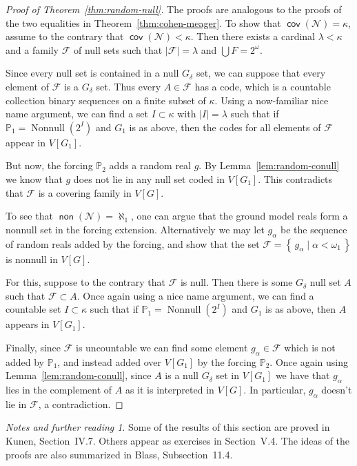 \documentclass[11pt,oneside]{amsbook}
\newcommand{\set}[1]{\left\{\,#1\,\right\}}
\newcommand{\PP}{\mathbb P}
\newcommand{\Null}{\mathcal N}
\DeclareMathOperator{\non}{\mathsf{non}}
\DeclareMathOperator{\cov}{\mathsf{cov}}
\DeclareMathOperator{\Nonnull}{Nonnull}
\theoremstyle{definition}
\theoremstyle{plain}
\theoremstyle{definition}
\theoremstyle{remark}
\newtheorem*{notes}{Notes and further reading}
\numberwithin{equation}{section}
\numberwithin{figure}{section}
\begin{document}
\begin{proof}[Proof of Theorem~\ref{thm:random-null}]
  The proofs are analogous to the proofs of the two equalities in Theorem~\ref{thm:cohen-meager}. To show that $\cov(\Null)=\kappa$, assume to the contrary that $\cov(\Null)<\kappa$. Then there exists a cardinal $\lambda<\kappa$ and a family $\mathcal F$ of null sets such that $|\mathcal F|=\lambda$ and $\bigcup F=2^\omega$.

  Since every null set is contained in a null $G_\delta$ set, we can suppose that every element of $\mathcal F$ is a $G_\delta$ set. Thus every $A\in\mathcal F$ has a code, which is a countable collection binary sequences on a finite subset of $\kappa$. Using a now-familiar nice name argument, we can find a set $I\subset\kappa$ with $|I|=\lambda$ such that if $\PP_1=\Nonnull(2^I)$ and $G_1$ is as above, then the codes for all elements of $\mathcal F$ appear in $V[G_1]$.

  But now, the forcing $\PP_2$ adds a random real $g$. By Lemma~\ref{lem:random-conull} we know that $g$ does not lie in any null set coded in $V[G_1]$. This contradicts that $\mathcal F$ is a covering family in $V[G]$.

  To see that $\non(\Null)=\aleph_1$, one can argue that the ground model reals form a nonnull set in the forcing extension. Alternatively we may let $g_\alpha$ be the sequence of random reals added by the forcing, and show that the set $\mathcal F=\set{g_\alpha\mid\alpha<\omega_1}$ is nonnull in $V[G]$.

  For this, suppose to the contrary that $\mathcal F$ is null. Then there is some $G_\delta$ null set $A$ such that $\mathcal F\subset A$. Once again using a nice name argument, we can find a countable set $I\subset\kappa$ such that if $\PP_1=\Nonnull(2^I)$ and $G_1$ is as above, then $A$ appears in $V[G_1]$.

  Finally, since $\mathcal F$ is uncountable we can find some element $g_\alpha\in\mathcal F$ which is not added by $\PP_1$, and instead added over $V[G_1]$ by the forcing $\PP_2$. Once again using Lemma~\ref{lem:random-conull}, since $A$ is a null $G_\delta$ set in $V[G_1]$ we have that $g_\alpha$ lies in the complement of $A$ as it is interpreted in $V[G]$. In particular, $g_\alpha$ doesn't lie in $\mathcal F$, a contradiction.
\end{proof}

\begin{notes}
  Some of the results of this section are proved in Kunen, Section~IV.7. Others appear as exercises in Section~V.4. The ideas of the proofs are also summarized in Blass, Subsection~11.4.
\end{notes}
\end{document}
